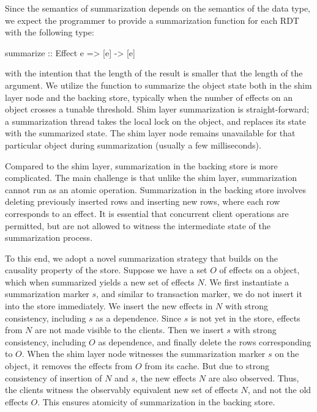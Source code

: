 Since the semantics of summarization depends on the semantics of the data type,
we expect the programmer to provide a summarization function for each RDT with
the following type:

\begin{codehaskell}
summarize :: Effect e => [e] -> [e]
\end{codehaskell}

\noindent with the intention that the length of the result is smaller that the
length of the argument. We utilize the  function to summarize the
object state both in the shim layer node and the backing store, typically when
the number of effects on an object crosses a tunable threshold. Shim layer
summarization is straight-forward; a summarization thread takes the local lock
on the object, and replaces its state with the summarized state. The shim layer
node remains unavailable for that particular object during summarization
(usually a few milliseconds).

Compared to the shim layer, summarization in the backing store is more
complicated. The main challenge is that unlike the shim layer, summarization
cannot run as an atomic operation. Summarization in the backing store involves
deleting previously inserted rows and inserting new rows, where each row
corresponds to an effect. It is essential that concurrent client operations are
permitted, but are not allowed to witness the intermediate state of the
summarization process.

To this end, we adopt a novel summarization strategy that builds on the
causality property of the store. Suppose we have a set $O$ of effects on a
object, which when summarized yields a new set of effects $N$. We first
instantiate a summarization marker $s$, and similar to transaction marker, we
do not insert it into the store immediately. We insert the new effects in $N$
with strong consistency, including $s$ as a dependence. Since $s$ is not yet in
the store, effects from $N$ are not made visible to the clients. Then we insert
$s$ with strong consistency, including $O$ as dependence, and finally delete
the rows corresponding to $O$. When the shim layer node witnesses the
summarization marker $s$ on the object, it removes the effects from $O$ from
its cache. But due to strong consistency of insertion of $N$ and $s$, the new
effects $N$ are also observed. Thus, the clients witness the observably
equivalent new set of effects $N$, and not the old effects $O$. This ensures
atomicity of summarization in the backing store.
